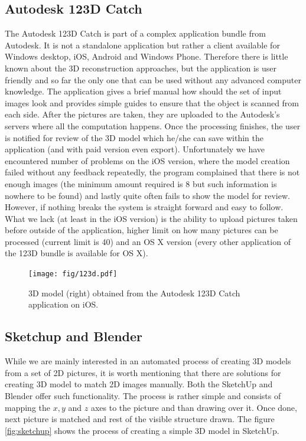 \subsection*{Autodesk 123D Catch}
The Autodesk 123D Catch \cite{123dcatch} is part of a complex application bundle from Autodesk. It is not a standalone application but rather a client available for Windows desktop, iOS, Android and Windows Phone. Therefore there is little known about the 3D reconstruction approaches, but the application is user friendly and so far the only one that can be used without any advanced computer knowledge. The application gives a brief manual how should the set of input images look and provides simple guides to ensure that the object is scanned from each side. After the pictures are taken, they are uploaded to the Autodesk's servers where all the computation happens. Once the processing finishes, the user is notified for review of the 3D model which he/she can save within the application (and with paid version even export). Unfortunately we have encountered number of problems on the iOS version, where the model creation failed without any feedback repeatedly, the program complained that there is not enough images (the minimum amount required is 8 but such information is nowhere to be found) and lastly quite often fails to show the model for review. However, if nothing breaks the system is straight forward and easy to follow. What we lack (at least in the iOS version) is the ability to upload pictures taken before outside of the application, higher limit on how many pictures can be processed (current limit is 40) and an OS X version (every other application of the 123D bundle is available for OS X).

\begin{figure}[ht]
	\begin{center}
		\texttt{[image: fig/123d.pdf]}
	\end{center}
	\caption{3D model (right) obtained from the Autodesk 123D Catch application on iOS.}
	\label{fig:openvmg}
\end{figure}

\subsection*{Sketchup and Blender}
While we are mainly interested in an automated process of creating 3D models from a set of 2D pictures, it is worth mentioning that there are solutions for creating 3D model to match 2D images manually. Both the SketchUp \cite{sketchup, sketchup-modeling} and Blender \cite{www:blender} offer such functionality. The process is rather simple and consists of mapping the $x, y$ and $z$ axes to the picture and than drawing over it. Once done, next picture is matched and rest of the visible structure drawn. The figure \ref{fig:sketchup} shows the process of creating a simple 3D model in SketchUp.

